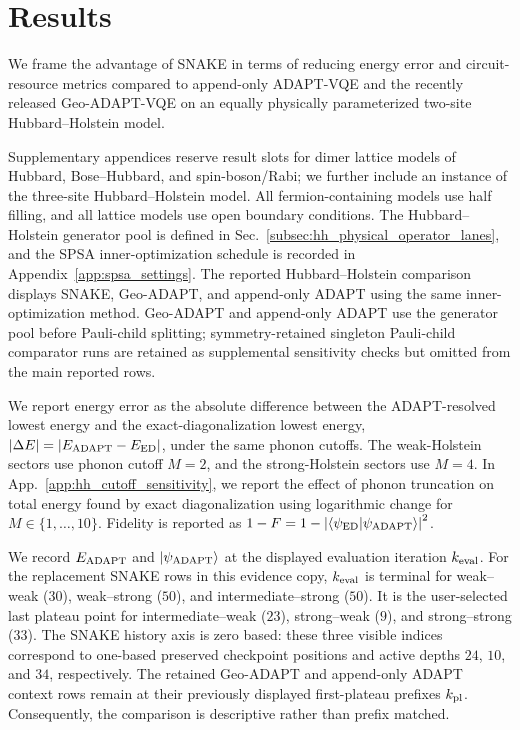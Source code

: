\documentclass[
  reprint,
  amsmath,
  amssymb,
  aps,
  pra,
  nofootinbib,
  superscriptaddress,
  floatfix
]{revtex4-2}
\newcommand{\ket}[1]{|#1\rangle}
\newcommand{\braket}[2]{\langle #1|#2\rangle}
\begin{document}


\section{Results}
\label{sec:results}
\label{sec:benchmarks}

We frame the advantage of SNAKE in terms of reducing energy error and circuit-resource metrics compared to append-only ADAPT-VQE and the recently released Geo-ADAPT-VQE on an equally physically parameterized two-site Hubbard--Holstein model. 

Supplementary appendices reserve result slots for dimer lattice models of Hubbard, Bose--Hubbard, and spin-boson/Rabi; we further include an instance of the three-site Hubbard--Holstein model. All fermion-containing models use half filling, and all lattice models use open boundary conditions. The Hubbard--Holstein generator pool is defined in Sec.~\ref{subsec:hh_physical_operator_lanes}, and the SPSA inner-optimization schedule is recorded in Appendix~\ref{app:spsa_settings}. The reported Hubbard--Holstein comparison displays SNAKE, Geo-ADAPT, and append-only ADAPT using the same inner-optimization method. Geo-ADAPT and append-only ADAPT use the generator pool before Pauli-child splitting; symmetry-retained singleton Pauli-child comparator runs are retained as supplemental sensitivity checks but omitted from the main reported rows.

We report energy error as the absolute difference between the ADAPT-resolved lowest energy and the exact-diagonalization lowest energy, \(|\Delta E|=|E_{\rm ADAPT}-E_{\rm ED}|\), under the same phonon cutoffs. The weak-Holstein sectors use phonon cutoff \(M=2\), and the strong-Holstein sectors use \(M=4\).
In App.~\ref{app:hh_cutoff_sensitivity}, we report the effect of phonon truncation on total energy found by exact diagonalization using logarithmic change for \(M\in\{1,\ldots,10\}\). Fidelity is reported as \(1-F=1-\left|\braket{\psi_{\rm ED}}{\psi_{\rm ADAPT}}\right|^2\).

We record $E_{\rm{ADAPT}}$ and $\ket{\psi_{\rm{ADAPT}}}$ at the displayed evaluation iteration $k_{\rm eval}$. For the replacement SNAKE rows in this evidence copy, $k_{\rm eval}$ is terminal for weak--weak ($30$), weak--strong ($50$), and intermediate--strong ($50$). It is the user-selected last plateau point for intermediate--weak ($23$), strong--weak ($9$), and strong--strong ($33$). The SNAKE history axis is zero based: these three visible indices correspond to one-based preserved checkpoint positions and active depths $24$, $10$, and $34$, respectively. The retained Geo-ADAPT and append-only ADAPT context rows remain at their previously displayed first-plateau prefixes $k_{\rm pl}$. Consequently, the comparison is descriptive rather than prefix matched.
\end{document}
